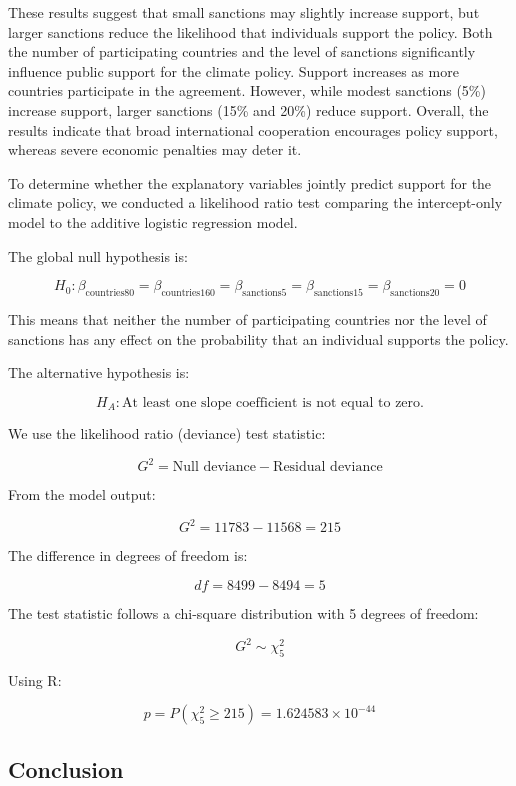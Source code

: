 \documentclass[12pt,letterpaper]{article}
\begin{document}
These results suggest that small sanctions may slightly increase support, but larger sanctions reduce the likelihood that individuals support the policy. Both the number of participating countries and the level of sanctions significantly influence public support for the climate policy. Support increases as more countries participate in the agreement. However, while modest sanctions (5\%) increase support, larger sanctions (15\% and 20\%) reduce support.  Overall, the results indicate that broad international cooperation encourages policy support, whereas severe economic penalties may deter it.

To determine whether the explanatory variables jointly predict support for the climate policy, we conducted a likelihood ratio test comparing the intercept-only model to the additive logistic regression model.


The global null hypothesis is:

\[
H_0: \beta_{\text{countries80}} = \beta_{\text{countries160}} = 
\beta_{\text{sanctions5}} = \beta_{\text{sanctions15}} = 
\beta_{\text{sanctions20}} = 0
\]

This means that neither the number of participating countries nor the level of sanctions has any effect on the probability that an individual supports the policy.

The alternative hypothesis is:

\[
H_A: \text{At least one slope coefficient is not equal to zero.}
\]

We use the likelihood ratio (deviance) test statistic:

\[
G^2 = \text{Null deviance} - \text{Residual deviance}
\]

From the model output:

\[
G^2 = 11783 - 11568 = 215
\]

The difference in degrees of freedom is:

\[
df = 8499 - 8494 = 5
\]


The test statistic follows a chi-square distribution with 5 degrees of freedom:

\[
G^2 \sim \chi^2_5
\]

Using R:

\[
p = P(\chi^2_5 \ge 215) = 1.624583 \times 10^{-44}
\]

\subsection*{Conclusion}
\end{document}

